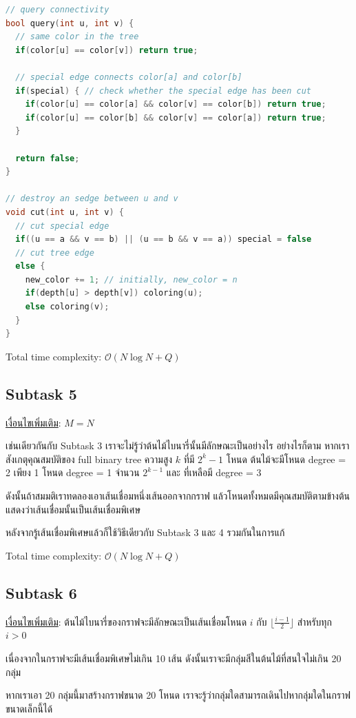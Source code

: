 \documentclass[12pt]{article}
\newcommand{\floor}[1]{\lfloor #1 \rfloor}
\begin{document}
\begin{lstlisting}[language=C++]
// query connectivity
bool query(int u, int v) {
  // same color in the tree
  if(color[u] == color[v]) return true;

  // special edge connects color[a] and color[b]
  if(special) { // check whether the special edge has been cut
    if(color[u] == color[a] && color[v] == color[b]) return true;
    if(color[u] == color[b] && color[v] == color[a]) return true;
  }
  
  return false;
}

// destroy an sedge between u and v
void cut(int u, int v) {
  // cut special edge
  if((u == a && v == b) || (u == b && v == a)) special = false
  // cut tree edge
  else {
    new_color += 1; // initially, new_color = n
    if(depth[u] > depth[v]) coloring(u);
    else coloring(v);
  }
}
\end{lstlisting}

Total time complexity: $\mathcal{O}(N \log N + Q)$

\subsection{Subtask 5}

\underline{เงื่อนไขเพิ่มเติม}: $M = N$

เช่นเดียวกันกับ Subtask 3 เราจะไม่รู้ว่าต้นไม้ไบนารี่นั้นมีลักษณะเป็นอย่างไร อย่างไรก็ตาม หากเราสังเกตุคุณสมบัติของ full binary tree ความสูง $k$ ที่มี $2^k-1$ โหนด ต้นไม้จะมีโหนด degree = 2 เพียง 1 โหนด degree = 1 จำนวน $2^{k-1}$ และ ที่เหลือมี degree = 3 

ดังนั้นถ้าสมมติเราทดลองเอาเส้นเชื่อมหนึ่งเส้นออกจากกราฟ แล้วโหนดทั้งหมดมีคุณสมบัติตามข้างต้น แสดงว่าเส้นเชื่อมนั้นเป็นเส้นเชื่อมพิเศษ

หลังจากรู้เส้นเชื่อมพิเศษแล้วก็ใช้วิธีเดียวกับ Subtask 3 และ 4 รวมกันในการแก้

Total time complexity: $\mathcal{O}(N \log N + Q)$

\subsection{Subtask 6}

\underline{เงื่อนไขเพิ่มเติม}: ต้นไม้ไบนารี่ของกราฟจะมีลักษณะเป็นเส้นเชื่อมโหนด $i$ กับ $\floor{\frac{i-1}{2}}$ สำหรับทุก $i > 0$

เนื่องจากในกราฟจะมีเส้นเชื่อมพิเศษไม่เกิน 10 เส้น ดังนั้นเราจะมีกลุ่มสีในต้นไม้ที่สนใจไม่เกิน 20 กลุ่ม 

หากเราเอา 20 กลุ่มนี้มาสร้างกราฟขนาด 20 โหนด เราจะรู้ว่ากลุ่มใดสามารถเดินไปหากลุ่มใดในกราฟขนาดเล็กนี้ได้
\end{document}
